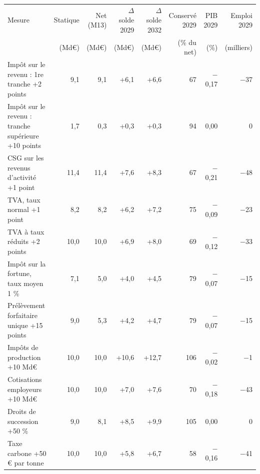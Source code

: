 \begin{tabular}{p{5.0cm}rrrrrrr}
\toprule
Mesure & Statique & Net (M13) & $\Delta$solde 2029 & $\Delta$solde 2032 & Conservé 2029 & PIB 2029 & Emploi 2029 \\
 & (Md€) & (Md€) & (Md€) & (Md€) & (\% du net) & (\%) & (milliers) \\
\midrule
Impôt sur le revenu : 1re tranche +2 points & 9{,}1 & 9{,}1 & +6{,}1 & +6{,}6 & 67 & $-$0{,}17 & $-$37 \\
Impôt sur le revenu : tranche supérieure +10 points & 1{,}7 & 0{,}3 & +0{,}3 & +0{,}3 & 94 & 0{,}00 & 0 \\
CSG sur les revenus d'activité +1 point & 11{,}4 & 11{,}4 & +7{,}6 & +8{,}3 & 67 & $-$0{,}21 & $-$48 \\
TVA, taux normal +1 point & 8{,}2 & 8{,}2 & +6{,}2 & +7{,}2 & 75 & $-$0{,}09 & $-$23 \\
TVA à taux réduits +2 points & 10{,}0 & 10{,}0 & +6{,}9 & +8{,}0 & 69 & $-$0{,}12 & $-$33 \\
Impôt sur la fortune, taux moyen 1 \% & 7{,}1 & 5{,}0 & +4{,}0 & +4{,}5 & 79 & $-$0{,}07 & $-$15 \\
Prélèvement forfaitaire unique +15 points & 9{,}0 & 5{,}3 & +4{,}2 & +4{,}7 & 79 & $-$0{,}07 & $-$15 \\
Impôts de production +10 Md€ & 10{,}0 & 10{,}0 & +10{,}6 & +12{,}7 & 106 & $-$0{,}02 & $-$1 \\
Cotisations employeurs +10 Md€ & 10{,}0 & 10{,}0 & +7{,}0 & +7{,}6 & 70 & $-$0{,}18 & $-$43 \\
Droits de succession +50 \% & 9{,}0 & 8{,}1 & +8{,}5 & +9{,}9 & 105 & 0{,}00 & 0 \\
Taxe carbone +50 € par tonne & 10{,}0 & 10{,}0 & +5{,}8 & +6{,}7 & 58 & $-$0{,}16 & $-$41 \\
\bottomrule
\end{tabular}
